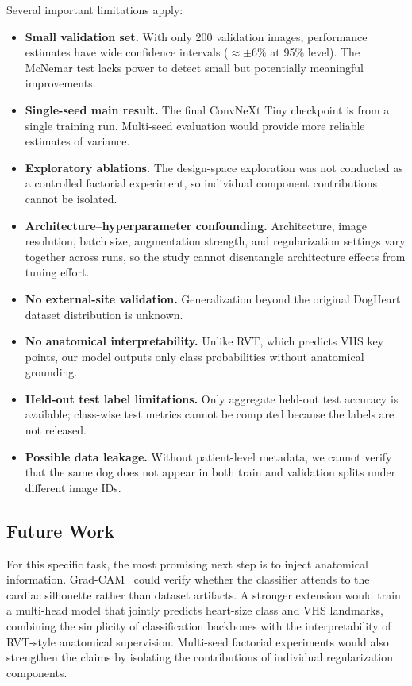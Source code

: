 \documentclass[10pt,twocolumn,letterpaper]{article}
\begin{document}
Several important limitations apply:
\begin{itemize}
    \item \textbf{Small validation set.} With only 200 validation images, performance estimates have wide confidence intervals ($\approx \pm 6\%$ at 95\% level). The McNemar test lacks power to detect small but potentially meaningful improvements.
    \item \textbf{Single-seed main result.} The final ConvNeXt Tiny checkpoint is from a single training run. Multi-seed evaluation would provide more reliable estimates of variance.
    \item \textbf{Exploratory ablations.} The design-space exploration was not conducted as a controlled factorial experiment, so individual component contributions cannot be isolated.
    \item \textbf{Architecture--hyperparameter confounding.} Architecture, image resolution, batch size, augmentation strength, and regularization settings vary together across runs, so the study cannot disentangle architecture effects from tuning effort.
    \item \textbf{No external-site validation.} Generalization beyond the original DogHeart dataset distribution is unknown.
    \item \textbf{No anatomical interpretability.} Unlike RVT, which predicts VHS key points, our model outputs only class probabilities without anatomical grounding.
    \item \textbf{Held-out test label limitations.} Only aggregate held-out test accuracy is available; class-wise test metrics cannot be computed because the labels are not released.
    \item \textbf{Possible data leakage.} Without patient-level metadata, we cannot verify that the same dog does not appear in both train and validation splits under different image IDs.
\end{itemize}

\subsection{Future Work}

For this specific task, the most promising next step is to inject anatomical information. Grad-CAM~\cite{gradcam2017} could verify whether the classifier attends to the cardiac silhouette rather than dataset artifacts. A stronger extension would train a multi-head model that jointly predicts heart-size class and VHS landmarks, combining the simplicity of classification backbones with the interpretability of RVT-style anatomical supervision. Multi-seed factorial experiments would also strengthen the claims by isolating the contributions of individual regularization components.
\end{document}
